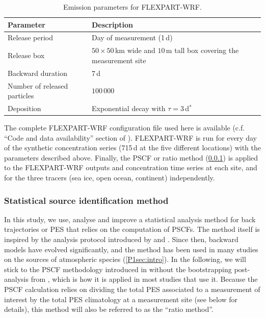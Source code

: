         \begin{table}[htb]
            \centering
            \caption{Emission parameters for FLEXPART-WRF.}
            \begin{tabular}{m{}|m{}}
                \toprule
                \textbf{Parameter} & \textbf{Description} \\
                \midrule
                Release period & Day of measurement (1\,d)\\
                Release box & $50\times 50$\,\unit{km} wide and $10$\,\unit{m} tall box covering the measurement site \\
                Backward duration & 7\,d\\
                Number of released particles & $100\,000$\\
                Deposition & Exponential decay with $\tau = 3$\,d$^*$ \\
                \bottomrule
            \end{tabular}
            \label{P1tab:FP_params}
        \end{table}

            The complete FLEXPART-WRF configuration file used here is available (c.f. ``Code and data availability'' section of \citet{da_silva_how_2025}).
            FLEXPART-WRF is run for every day of the synthetic concentration series (715\,d at the five different locations) with the parameters described above.
            Finally, the PSCF or ratio method (\cref{P1sec:ratio_method}) is applied to the FLEXPART-WRF outputs and concentration time series at each site, and for the three tracers (sea ice, open ocean, continent) independently.

    \subsubsection{Statistical source identification method}
        \label{P1sec:ratio_method}

        In this study, we use, analyse and improve a statistical analysis method for back trajectories or PES that relies on the computation of PSCFs.
        The method itself is inspired by the analysis protocol introduced by \citet{ashbaugh_statistical_1983} and \citet{ashbaugh_residence_1985}.
        Since then, backward models have evolved significantly, and the method has been used in many studies on the sources of atmospheric species (\cref{P1sec:intro}).
        In the following, we will stick to the PSCF methodology introduced in \citet{hirdman_source_2010} without the bootstrapping post-analysis from \citet{ashbaugh_residence_1985}, which is how it is applied in most studies that use it. Because the PSCF calculation relies on dividing the total PES associated to a measurement of interest by the total PES climatology at a measurement site (see below for details), this method will also be referred to as the ``ratio method''.

